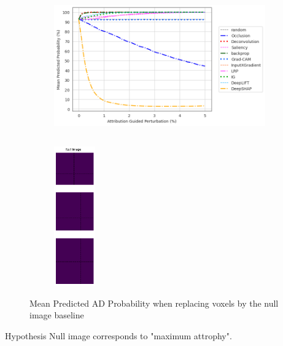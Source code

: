 \documentclass[aspectratio=169,xcolor={table, dvipsnames}]{beamer}
\begin{document}
\begin{frame}[plain]{}
	\begin{figure}
		\begin{subfigure}{0.8\textwidth}
			\centering
			\includegraphics[height=6cm]{figures/3672-ad-fidelity-null.png}

		\end{subfigure}\hfill
		\begin{subfigure}{0.2\textwidth}
			\centering
			\includegraphics[height=6cm]{figures/null_img.png}
		\end{subfigure}
		\caption*{Mean Predicted AD Probability when replacing voxels by the null image baseline}
	\end{figure}
	\begin{block}{Hypothesis}
		Null image corresponds to "maximum attrophy".
	\end{block}
\end{frame}
\end{document}
